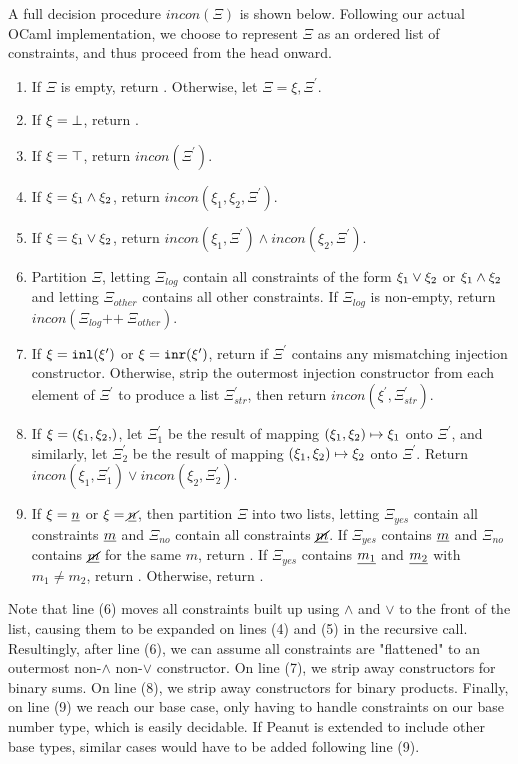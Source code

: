 A full decision procedure $incon(\Xi)$ is shown below. Following our actual OCaml implementation, we choose to represent $\Xi$ as an ordered list of constraints, and thus proceed from the head onward.

\begin{enumerate}
\item If $\Xi$ is empty, return . Otherwise, let $\Xi = \xi, \Xi^\prime$.
\item If $\xi = \bot$, return .
\item If $\xi = \top$, return $incon(\Xi^\prime)$.
\item If $\xi = \xi_1 \wedge \xi_2$, return $incon(\xi_1, \xi_2, \Xi^\prime)$.
\item If $\xi = \xi_1 \vee \xi_2$, return $incon(\xi_1, \Xi^\prime) \land incon(\xi_2, \Xi^\prime)$.
\item Partition $\Xi$, letting $\Xi_{log}$ contain all constraints of the form $\xi_1 \vee \xi_2$ or $\xi_1 \wedge \xi_2$ and letting $\Xi_{other}$ contains all other constraints. If $\Xi_{log}$ is non-empty, return $incon(\Xi_{log} \texttt{++}~ \Xi_{other})$.
\item If $\xi = \mathtt{inl}(\xi^\prime)$ or $\xi = \mathtt{inr}(\xi^\prime)$, return  if $\Xi^\prime$ contains any mismatching injection constructor. Otherwise, strip the outermost injection constructor from each element of $\Xi^\prime$ to produce a list $\Xi^\prime_{str}$, then return $incon(\xi^\prime, \Xi^\prime_{str})$.
\item If $\xi = \cpair{\xi_1, \xi_2}$, let $\Xi^\prime_1$ be the result of mapping $(\xi_1 , \xi_2) \mapsto \xi_1$ onto $\Xi^\prime$, and similarly, let $\Xi^\prime_2$ be the result of mapping $(\xi_1 , \xi_2) \mapsto \xi_2$ onto $\Xi^\prime$. Return $incon(\xi_1, \Xi^\prime_1) \lor incon(\xi_2, \Xi^\prime_2)$.
\item If $\xi = \underline{n}$ or $\xi = \underline{\cancel{n}}$, then partition $\Xi$ into two lists, letting $\Xi_{yes}$ contain all constraints $\underline{m}$ and $\Xi_{no}$ contain all constraints $\underline{\cancel{m}}$. If $\Xi_{yes}$ contains $\underline{m}$ and $\Xi_{no}$ contains $\underline{\cancel{m}}$ for the same $m$, return . If $\Xi_{yes}$ contains $\underline{m_1}$ and $\underline{m_2}$ with $m_1 \neq m_2$, return . Otherwise, return .
\end{enumerate}

Note that line (6) moves all constraints built up using $\land$ and $\lor$ to the front of the list, causing them to be expanded on lines (4) and (5) in the recursive call. Resultingly, after line (6), we can assume all constraints are "flattened" to an outermost non-$\land$ non-$\lor$ constructor. On line (7), we strip away constructors for binary sums. On line (8), we strip away constructors for binary products. Finally, on line (9) we reach our base case, only having to handle constraints on our base number type, which is easily decidable. If Peanut is extended to include other base types, similar cases would have to be added following line (9).

